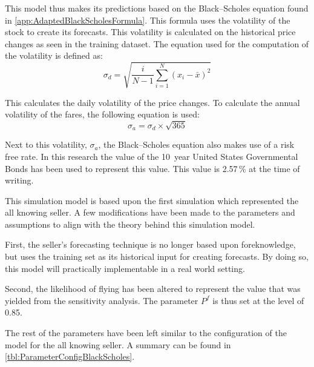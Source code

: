 This model thus makes its predictions based on the Black--Scholes equation found in \autoref{app:AdaptedBlackScholesFormula}. This formula uses the volatility of the stock to create its forecasts. This volatility is calculated on the historical price changes as seen in the training dataset. The equation used for the computation of the volatility is defined as:
$$\sigma_d = \sqrt{\frac{i}{N-1}\sum_{i=1}^N(x_i - \bar{x})^2} $$

This calculates the daily volatility of the price changes. To calculate the annual volatility of the fares, the following equation is used:
$$\sigma_a = \sigma_d \times \sqrt{365} $$

Next to this volatility, $\sigma_a$, the Black--Scholes equation also makes use of a risk free rate. In this research the value of the 10~year United States Governmental Bonds has been used to represent this value. This value is 2.57\,\% at the time of writing.

This simulation model is based upon the first simulation which represented the all knowing seller. A few modifications have been made to the parameters and assumptions to align with the theory behind this simulation model.

First, the seller's forecasting technique is no longer based upon foreknowledge, but uses the training set as its historical input for creating forecasts. By doing so, this model will practically implementable in a real world setting.

Second, the likelihood of flying has been altered to represent the value that was yielded from the sensitivity analysis. The parameter $P^f$ is thus set at the level of 0.85.

The rest of the parameters have been left similar to the configuration of the model for the all knowing seller. A summary can be found in \autoref{tbl:ParameterConfigBlackScholes}.


